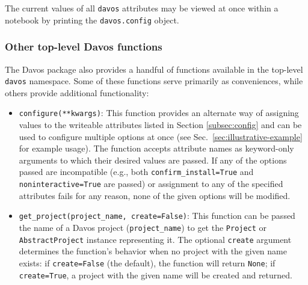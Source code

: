 \documentclass[preprint,12pt,a4paper]{elsarticle}
\begin{document}
\noindent The current values of all \texttt{davos} attributes may be viewed at once within a notebook by printing the \texttt{davos.config} object.


\subsubsection{Other top-level Davos functions}\label{subsec:toplevel}

The Davos package also provides a handful of functions available in the top-level \texttt{davos} namespace.
Some of these functions serve primarily as conveniences, while others provide additional functionality:

\begin{itemize}

\item \texttt{configure(**kwargs)}: This function provides an alternate way of assigning values to the writeable attributes listed in Section \ref{subsec:config} and can be used to configure multiple options at once (see Sec.~\ref{sec:illustrative-example} for example usage).
  The function accepts attribute names as keyword-only arguments to which their desired values are passed.
  If any of the options passed are incompatible (e.g., both \texttt{confirm\_install=True} and \texttt{noninteractive=True} are passed) or assignment to any of the specified attributes fails for any reason, none of the given options will be modified.

\item \texttt{get\_project(project\_name, create=False)}: This function can be passed the name of a Davos project (\texttt{project\_name}) to get the \texttt{Project} or \texttt{AbstractProject} instance representing it.
  The optional \texttt{create} argument determines the function's behavior when no project with the given name exists: if \texttt{create=False} (the default), the function will return \texttt{None}; if \texttt{create=True}, a project with the given name will be created and returned.


\end{itemize}
\end{document}
